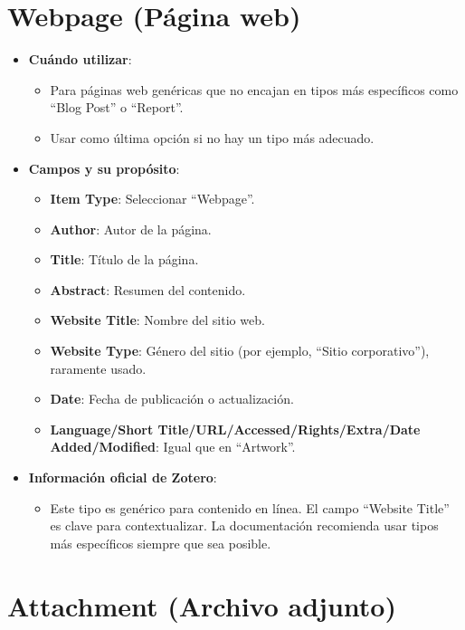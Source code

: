 \documentclass[
  jou,
  floatsintext,
  longtable,
  a4paper,
  nolmodern,
  notxfonts,
  notimes,
  12pt,
  colorlinks=true,linkcolor=blue,citecolor=blue,urlcolor=blue]{apa7}
\providecommand{\tightlist}{%
  \setlength{\itemsep}{0pt}\setlength{\parskip}{0pt}}
\begin{document}
\section{Webpage (Página web)}\label{webpage-puxe1gina-web}

\begin{itemize}
\tightlist
\item
  \textbf{Cuándo utilizar}:

  \begin{itemize}
  \tightlist
  \item
    Para páginas web genéricas que no encajan en tipos más específicos
    como ``Blog Post'' o ``Report''.
  \item
    Usar como última opción si no hay un tipo más adecuado.
  \end{itemize}
\item
  \textbf{Campos y su propósito}:

  \begin{itemize}
  \tightlist
  \item
    \textbf{Item Type}: Seleccionar ``Webpage''.
  \item
    \textbf{Author}: Autor de la página.
  \item
    \textbf{Title}: Título de la página.
  \item
    \textbf{Abstract}: Resumen del contenido.
  \item
    \textbf{Website Title}: Nombre del sitio web.
  \item
    \textbf{Website Type}: Género del sitio (por ejemplo, ``Sitio
    corporativo''), raramente usado.
  \item
    \textbf{Date}: Fecha de publicación o actualización.
  \item
    \textbf{Language/Short Title/URL/Accessed/Rights/Extra/Date
    Added/Modified}: Igual que en ``Artwork''.
  \end{itemize}
\item
  \textbf{Información oficial de Zotero}:

  \begin{itemize}
  \tightlist
  \item
    Este tipo es genérico para contenido en línea. El campo ``Website
    Title'' es clave para contextualizar. La documentación recomienda
    usar tipos más específicos siempre que sea posible.
  \end{itemize}
\end{itemize}

\section{Attachment (Archivo adjunto)}\label{attachment-archivo-adjunto}
\end{document}
